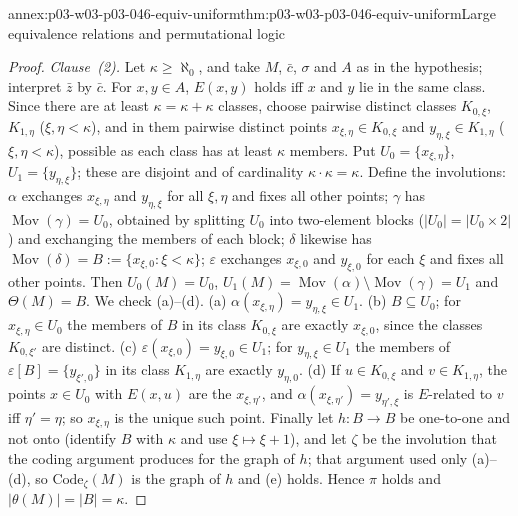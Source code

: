 \begin{annexitem}{annex:p03-w03-p03-046-equiv-uniform}{thm:p03-w03-p03-046-equiv-uniform}{Large equivalence relations and permutational logic}
\begin{proof}
\emph{Clause~(2).} Let \(\kappa\ge\aleph_0\), and take \(M\), \(\bar c\),
\(\sigma\) and \(A\) as in the hypothesis; interpret \(\bar z\) by
\(\bar c\). For \(x,y\in A\), \(E(x,y)\) holds iff \(x\) and \(y\) lie in
the same class. Since there are at least \(\kappa=\kappa+\kappa\) classes,
choose pairwise distinct classes \(K_{0,\xi}\), \(K_{1,\eta}\)
(\(\xi,\eta<\kappa\)), and in them pairwise distinct points
\(x_{\xi,\eta}\in K_{0,\xi}\) and \(y_{\eta,\xi}\in K_{1,\eta}\)
(\(\xi,\eta<\kappa\)), possible as each class has at least \(\kappa\)
members. Put \(U_0=\{x_{\xi,\eta}\}\), \(U_1=\{y_{\eta,\xi}\}\); these are
disjoint and of cardinality \(\kappa\cdot\kappa=\kappa\). Define the
involutions:
\(\alpha\) exchanges \(x_{\xi,\eta}\) and \(y_{\eta,\xi}\) for all
\(\xi,\eta\) and fixes all other points;
\(\gamma\) has \(\operatorname{Mov}(\gamma)=U_0\), obtained by splitting
\(U_0\) into two-element blocks (\(|U_0|=|U_0\times 2|\)) and exchanging
the members of each block;
\(\delta\) likewise has \(\operatorname{Mov}(\delta)=B:=\{x_{\xi,0}:\xi<\kappa\}\);
\(\varepsilon\) exchanges \(x_{\xi,0}\) and \(y_{\xi,0}\) for each \(\xi\)
and fixes all other points. Then \(U_0(M)=U_0\),
\(U_1(M)=\operatorname{Mov}(\alpha)\setminus\operatorname{Mov}(\gamma)=U_1\)
and \(\Theta(M)=B\). We check (a)--(d).
(a) \(\alpha(x_{\xi,\eta})=y_{\eta,\xi}\in U_1\).
(b) \(B\subseteq U_0\); for \(x_{\xi,\eta}\in U_0\) the members of \(B\) in
its class \(K_{0,\xi}\) are exactly \(x_{\xi,0}\), since the classes
\(K_{0,\xi'}\) are distinct.
(c) \(\varepsilon(x_{\xi,0})=y_{\xi,0}\in U_1\); for \(y_{\eta,\xi}\in U_1\)
the members of \(\varepsilon[B]=\{y_{\xi',0}\}\) in its class
\(K_{1,\eta}\) are exactly \(y_{\eta,0}\).
(d) If \(u\in K_{0,\xi}\) and \(v\in K_{1,\eta}\), the points
\(x\in U_0\) with \(E(x,u)\) are the \(x_{\xi,\eta'}\), and
\(\alpha(x_{\xi,\eta'})=y_{\eta',\xi}\) is \(E\)-related to \(v\) iff
\(\eta'=\eta\); so \(x_{\xi,\eta}\) is the unique such point.
Finally let \(h\colon B\to B\) be one-to-one and not onto (identify \(B\)
with \(\kappa\) and use \(\xi\mapsto\xi+1\)), and let \(\zeta\) be the
involution that the coding argument produces for the graph of \(h\); that
argument used only (a)--(d), so \(\mathrm{Code}_\zeta(M)\) is
the graph of \(h\) and (e) holds. Hence \(\pi\) holds and
\(|\theta(M)|=|B|=\kappa\).
\end{proof}
\end{annexitem}

